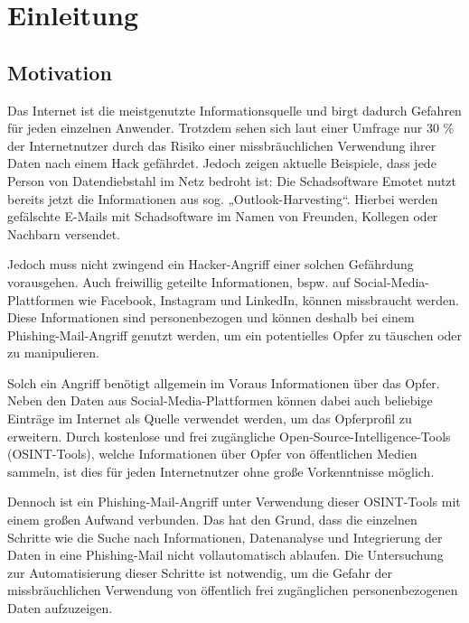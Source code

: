 \chapter{Einleitung}
\label{cha:einleitung}

\section{Motivation}
Das Internet ist die meistgenutzte Informationsquelle und birgt dadurch Gefahren für jeden einzelnen Anwender.  \cite{Inforamtionsquellen} Trotzdem sehen sich laut einer Umfrage nur 30 \% der Internetnutzer durch das Risiko einer missbräuchlichen Verwendung ihrer Daten nach einem Hack gefährdet. \cite{AngstDatendiebstahl} Jedoch zeigen aktuelle Beispiele, dass jede Person von Datendiebstahl im Netz bedroht ist: Die Schadsoftware Emotet nutzt bereits jetzt die Informationen aus sog. „Outlook-Harvesting“. Hierbei werden gefälschte E-Mails mit Schadsoftware im Namen von Freunden, Kollegen oder Nachbarn versendet. \cite{bsiEmotet}

Jedoch muss nicht zwingend ein Hacker-Angriff einer solchen Gefährdung vorausgehen. Auch freiwillig geteilte Informationen, bspw. auf Social-Media-Plattformen wie Facebook, Instagram und LinkedIn, können missbraucht werden. Diese Informationen sind personenbezogen und können deshalb bei einem Phishing-Mail-Angriff genutzt werden, um ein potentielles Opfer zu täuschen oder zu manipulieren.

Solch ein Angriff benötigt allgemein im Voraus Informationen über das Opfer.  Neben den Daten aus Social-Media-Plattformen können dabei auch beliebige Einträge im Internet als Quelle verwendet werden, um das Opferprofil zu erweitern. Durch kostenlose und frei zugängliche Open-Source-Intelligence-Tools (OSINT-Tools), welche Informationen über Opfer von öffentlichen Medien sammeln, ist dies für jeden Internetnutzer ohne große Vorkenntnisse möglich. 

Dennoch ist ein Phishing-Mail-Angriff unter Verwendung dieser OSINT-Tools mit einem großen Aufwand verbunden. Das hat den Grund, dass die einzelnen Schritte wie die Suche nach Informationen, Datenanalyse und Integrierung der Daten in eine Phishing-Mail nicht vollautomatisch ablaufen. Die Untersuchung zur Automatisierung dieser Schritte ist notwendig, um die Gefahr der missbräuchlichen Verwendung von öffentlich frei zugänglichen personenbezogenen Daten aufzuzeigen.

